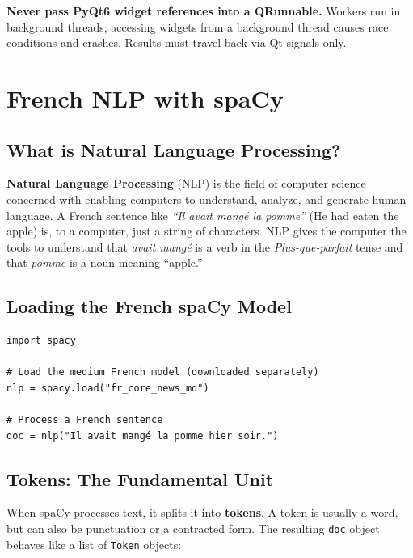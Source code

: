 \documentclass[12pt,oneside]{book}
\begin{document}
\begin{warnbox}
\textbf{Never pass PyQt6 widget references into a QRunnable.} Workers run in background
threads; accessing widgets from a background thread causes race conditions and crashes.
Results must travel back via Qt signals only.
\end{warnbox}

\chapter{French NLP with spaCy}
\label{ch:nlp}

\section{What is Natural Language Processing?}

\textbf{Natural Language Processing} (NLP) is the field of computer science concerned
with enabling computers to understand, analyze, and generate human language. A French
sentence like \textit{``Il avait mangé la pomme''} (He had eaten the apple) is,
to a computer, just a string of characters. NLP gives the computer the tools to
understand that \textit{avait mangé} is a verb in the \textit{Plus-que-parfait} tense
and that \textit{pomme} is a noun meaning ``apple.''

\section{Loading the French spaCy Model}

\begin{lstlisting}[caption={Loading the French model (LLR-12)}]
import spacy

# Load the medium French model (downloaded separately)
nlp = spacy.load("fr_core_news_md")

# Process a French sentence
doc = nlp("Il avait mangé la pomme hier soir.")
\end{lstlisting}

\section{Tokens: The Fundamental Unit}

When spaCy processes text, it splits it into \textbf{tokens}. A token is usually a word,
but can also be punctuation or a contracted form. The resulting \texttt{doc} object
behaves like a list of \texttt{Token} objects:
\end{document}
